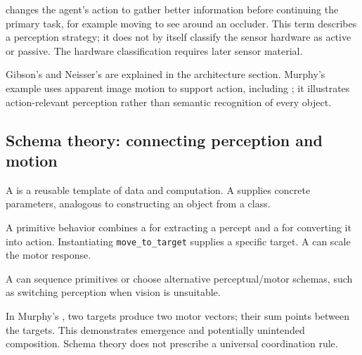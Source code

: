  changes the agent's action to gather better information before continuing the primary task, for example moving to see around an occluder. This term describes a perception strategy; it does not by itself classify the sensor hardware as active or passive. The hardware classification requires later sensor material.

Gibson's  and Neisser's  are explained in the architecture section. Murphy's  example uses apparent image motion to support action, including ; it illustrates action-relevant perception rather than semantic recognition of every object.

\subsection{Schema theory: connecting perception and motion}
A  is a reusable template of data and computation. A  supplies concrete parameters, analogous to constructing an object from a class.

A primitive behavior combines a  for extracting a percept and a  for converting it into action. Instantiating \texttt{move\_to\_target} supplies a specific target. A  can scale the motor response.

A  can sequence primitives or choose alternative perceptual/motor schemas, such as switching perception when vision is unsuitable.

In Murphy's , two targets produce two motor vectors; their sum points between the targets. This demonstrates emergence and potentially unintended composition. Schema theory does not prescribe a universal coordination rule.


